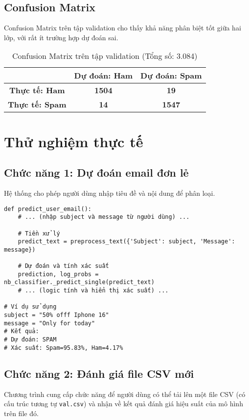 \subsection{Confusion Matrix}
Confusion Matrix trên tập validation cho thấy khả năng phân biệt tốt giữa hai lớp, với rất ít trường hợp dự đoán sai.

\begin{table}[H]
\centering
\begin{tabular}{|c|c|c|}
\hline
& \textbf{Dự đoán: Ham} & \textbf{Dự đoán: Spam} \\
\hline
\textbf{Thực tế: Ham} & \textbf{1504} & \textbf{19} \\
\hline
\textbf{Thực tế: Spam} & \textbf{14} & \textbf{1547} \\
\hline
\end{tabular}
\caption{Confusion Matrix trên tập validation (Tổng số: 3.084)}
\label{fig:confusion_matrix}
\end{table}

\section{Thử nghiệm thực tế}

\subsection{Chức năng 1: Dự đoán email đơn lẻ}
Hệ thống cho phép người dùng nhập tiêu đề và nội dung để phân loại.

\begin{verbatim}
def predict_user_email():
    # ... (nhập subject và message từ người dùng) ...
    
    # Tiền xử lý
    predict_text = preprocess_text({'Subject': subject, 'Message': message})
    
    # Dự đoán và tính xác suất
    prediction, log_probs = nb_classifier._predict_single(predict_text)
    # ... (logic tính và hiển thị xác suất) ...

# Ví dụ sử dụng
subject = "50% offf Iphone 16"
message = "Only for today"
# Kết quả:
# Dự đoán: SPAM
# Xác suất: Spam=95.83%, Ham=4.17%
\end{verbatim}

\subsection{Chức năng 2: Đánh giá file CSV mới}
Chương trình cung cấp chức năng để người dùng có thể tải lên một file CSV (có cấu trúc tương tự \texttt{val.csv}) và nhận về kết quả đánh giá hiệu suất của mô hình trên file đó.

